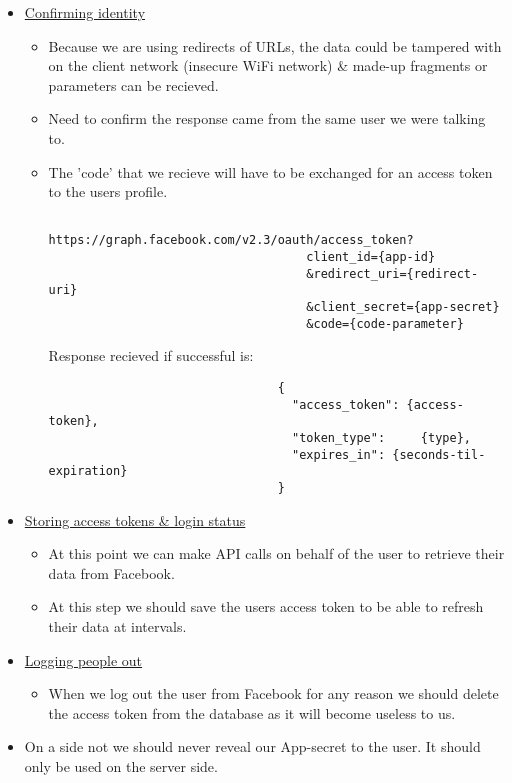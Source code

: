 \documentclass{article}
\begin{document}
\begin{itemize}
				\item \href{https://developers.facebook.com/docs/facebook-login/manually-build-a-login-flow#confirm}{Confirming identity}
					\begin{itemize}
						\item Because we are using redirects of URLs, the data could be tampered with on the client network (insecure WiFi network) \& made-up fragments or parameters can be recieved.
						\item Need to confirm the response came from the same user we were talking to.
						\item The 'code' that we recieve will have to be exchanged for an access token to the users profile.
							\begin{verbatim}
								https://graph.facebook.com/v2.3/oauth/access_token?
    								client_id={app-id}
   									&redirect_uri={redirect-uri}
   									&client_secret={app-secret}
   									&code={code-parameter}
							\end{verbatim}
						Response recieved if successful is:
							\begin{verbatim}
								{
								  "access_token": {access-token}, 
								  "token_type": 	{type},
								  "expires_in":	{seconds-til-expiration}
								}
							\end{verbatim}
					\end{itemize}
				\item \href{https://developers.facebook.com/docs/facebook-login/manually-build-a-login-flow#token}{Storing access tokens \& login status}
					\begin{itemize}
						\item At this point we can make API calls on behalf of the user to retrieve their data from Facebook.
						\item At this step we should save the users access token to be able to refresh their data at intervals.
					\end{itemize}
				\item \href{https://developers.facebook.com/docs/facebook-login/manually-build-a-login-flow#logout}{Logging people out}
					\begin{itemize}
						\item When we log out the user from Facebook for any reason we should delete the access token from the database as it will become useless to us.
					\end{itemize}
				\item On a side not we should never reveal our App-secret to the user. It should only be used on the server side.
			\end{itemize}
\end{document}
